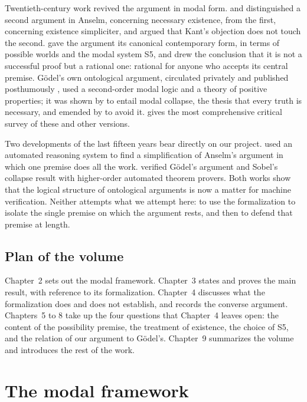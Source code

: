 \documentclass{situationist-preprint}
\begin{document}
Twentieth-century work revived the argument in modal form. \citet{Malcolm1960} and \citet{Hartshorne1962} distinguished a second argument in Anselm, concerning necessary existence, from the first, concerning existence simpliciter, and argued that Kant's objection does not touch the second. \citet{Plantinga1974} gave the argument its canonical contemporary form, in terms of possible worlds and the modal system S5, and drew the conclusion that it is not a successful proof but a rational one: rational for anyone who accepts its central premise. Gödel's own ontological argument, circulated privately and published posthumously \citep{Godel1995}, used a second-order modal logic and a theory of positive properties; it was shown by \citet{Sobel1987} to entail modal collapse, the thesis that every truth is necessary, and emended by \citet{Anderson1990} to avoid it. \citet{Oppy1995} gives the most comprehensive critical survey of these and other versions.

Two developments of the last fifteen years bear directly on our project. \citet{Oppenheimer2011} used an automated reasoning system to find a simplification of Anselm's argument in which one premise does all the work. \citet{Benzmuller2014} verified Gödel's argument and Sobel's collapse result with higher-order automated theorem provers. Both works show that the logical structure of ontological arguments is now a matter for machine verification. Neither attempts what we attempt here: to use the formalization to isolate the single premise on which the argument rests, and then to defend that premise at length.

\subsection{Plan of the volume}

Chapter~2 sets out the modal framework. Chapter~3 states and proves the main result, with reference to its formalization. Chapter~4 discusses what the formalization does and does not establish, and records the converse argument. Chapters~5 to 8 take up the four questions that Chapter~4 leaves open: the content of the possibility premise, the treatment of existence, the choice of S5, and the relation of our argument to Gödel's. Chapter~9 summarizes the volume and introduces the rest of the work.

\section{The modal framework}
\end{document}
